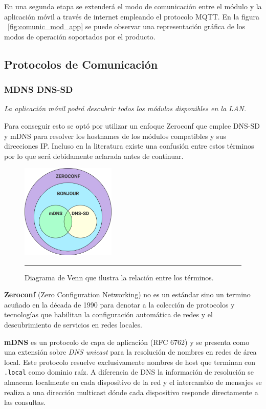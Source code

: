 En una segunda etapa se extenderá el modo de comunicación entre el módulo y la aplicación móvil a través de internet empleando el protocolo MQTT. En la figura ~\ref{fig:comunic_mod_app} se puede observar una representación gráfica de los modos de operación soportados por el producto.

\subsection{Protocolos de Comunicación}
\subsubsection{MDNS DNS-SD}
\emph{La aplicación móvil podrá descubrir todos los módulos disponibles en la LAN.}

Para conseguir esto se optó por utilizar un enfoque Zeroconf que emplee DNS-SD y mDNS para resolver los hostnames de los módulos compatibles y sus direcciones IP. Incluso en la literatura existe una confusión entre estos términos por lo que será debidamente aclarada antes de continuar.

\begin{figure}[htbp]
	\centering
	\includegraphics[width=0.4\textwidth]{Figures/design/zeroconf_venn.png}
	\rule{35em}{1pt}
	\caption[Desambiguación Zeroconf]{Diagrama de Venn que ilustra la relación entre los términos.}
	\label{fig:zeroconf_venn}
\end{figure}

\textbf{Zeroconf} (Zero Configuration Networking) no es un estándar sino un termino acuñado en la década de 1990 para denotar a la colección de protocolos y tecnologías que habilitan la configuración automática de redes y el descubrimiento de servicios en redes locales.

\textbf{mDNS} es un protocolo de capa de aplicación (RFC 6762) y se presenta como una extensión sobre \emph{DNS unicast} para la resolución de nombres en redes de área local. Este protocolo resuelve exclusivamente nombres de host que terminan con \texttt{.local} como dominio raíz. A diferencia de DNS la información de resolución se almacena localmente en cada dispositivo de la red y el intercambio de mensajes se realiza a una dirección multicast dónde cada dispositivo responde directamente a las consultas. 

